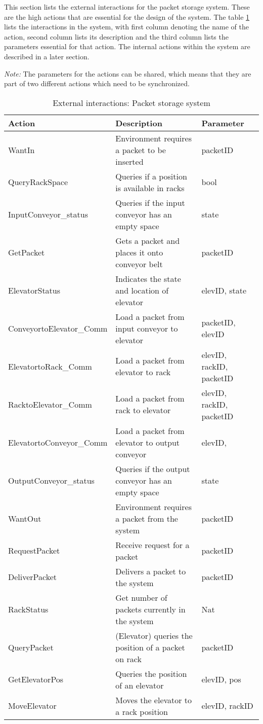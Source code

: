 \label{sec:ext_interactions}
This section lists the external interactions for the packet storage system. These are the high actions that are essential for the design of the system. The table \ref{tab: ext_interactions} lists the interactions in the system, with first column denoting the name of the action, second column lists its description and the third column lists the parameters essential for that action. The internal actions within the system are described in a later section.

\textit{Note:} The parameters for the actions can be shared, which means that they are part of two different actions which need to be synchronized.

\begin{table}[ht]
\centering
\begin{tabular}{|l|l|l|}\hline
Action & Description & Parameter \\\hline
WantIn & Environment requires a packet to be inserted & packetID \\\hline
QueryRackSpace & Queries if a position is available in racks & bool \\\hline
InputConveyor\_status & Queries if the input conveyor has an empty space & state \\\hline
GetPacket & Gets a packet and places it onto conveyor belt & packetID\\\hline
ElevatorStatus & Indicates the state and location of elevator & elevID, state \\\hline
ConveyortoElevator\_Comm & Load a packet from input conveyor to elevator & packetID, elevID \\\hline
ElevatortoRack\_Comm & Load a packet from elevator to rack & elevID, rackID, packetID \\\hline
RacktoElevator\_Comm & Load a packet from rack to elevator & elevID, rackID, packetID \\\hline
ElevatortoConveyor\_Comm & Load a packet from elevator to output conveyor & elevID, %
\\\hline
OutputConveyor\_status & Queries if the output conveyor has an empty space & state \\\hline
WantOut & Environment requires a packet from the system & packetID \\\hline
RequestPacket & Receive request for a packet & packetID \\\hline
DeliverPacket & Delivers a packet to the system & packetID \\\hline
RackStatus & Get number of packets currently in the system & Nat \\\hline
QueryPacket & (Elevator) queries the position of a packet on rack & packetID \\\hline
GetElevatorPos & Queries the position of an elevator & elevID, pos \\\hline
MoveElevator & Moves the elevator to a rack position & elevID, rackID \\\hline
\end{tabular}
\caption{External interactions: Packet storage system }
\label{tab: ext_interactions}
\end{table}
